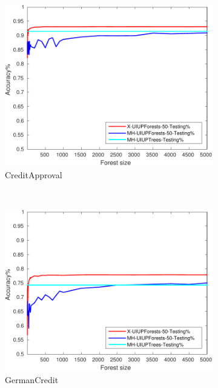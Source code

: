 \begin{figure}[ht]
  \begin{subfigure}[b]{0.3\textwidth}
		\centering
  	\includegraphics[width=\textwidth]{figs/PLPTF/Forests/CreditApprovalDownsampledFurther_Forests_X_MH.pdf}
  	\caption{CreditApproval}
		\label{fig:Crd3}
	\end{subfigure}
  \\
  \begin{subfigure}[b]{0.3\textwidth}
		\centering
  	\includegraphics[width=\textwidth]{figs/PLPTF/Forests/GermanCreditDownsampledFurther_Forests_X_MH.pdf}
  	\caption{GermanCredit}
		\label{fig:G3}
	\end{subfigure}
  \begin{subfigure}[b]{0.3\textwidth}

\end{subfigure}
\end{figure}

